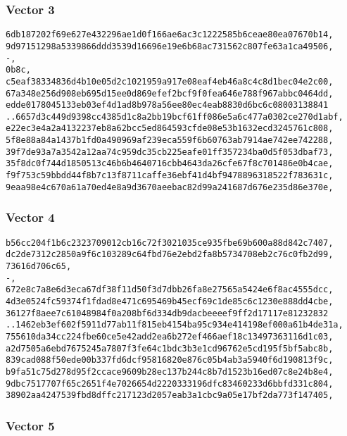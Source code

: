 \documentclass[
]{article}
\begin{document}
\hypertarget{vector-3-1}{%
\subsubsection{Vector 3}\label{vector-3-1}}

\begin{verbatim}
6db187202f69e627e432296ae1d0f166ae6ac3c1222585b6ceae80ea07670b14,
9d97151298a5339866ddd3539d16696e19e6b68ac731562c807fe63a1ca49506,
-,
0b8c,
c5eaf38334836d4b10e05d2c1021959a917e08eaf4eb46a8c4c8d1bec04e2c00,
67a348e256d908eb695d15ee0d869efef2bcf9f0fea646e788f967abbc0464dd,
edde0178045133eb03ef4d1ad8b978a56ee80ec4eab8830d6bc6c08003138841
..6657d3c449d9398cc4385d1c8a2bb19bcf61ff086e5a6c477a0302ce270d1abf,
e22ec3e4a2a4132237eb8a62bcc5ed864593cfde08e53b1632ecd3245761c808,
5f8e88a84a1437b1fd0a490969af239eca559f6b60763ab7914ae742ee742288,
39f7de93a7a3542a12aa74c959dc35cb225eafe01ff357234ba0d5f053dbaf73,
35f8dc0f744d1850513c46b6b4640716cbb4643da26cfe67f8c701486e0b4cae,
f9f753c59bbdd44f8b7c13f8711caffe36ebf41d4bf9478896318522f783631c,
9eaa98e4c670a61a70ed4e8a9d3670aeebac82d99a241687d676e235d86e370e,
\end{verbatim}

\hypertarget{vector-4-1}{%
\subsubsection{Vector 4}\label{vector-4-1}}

\begin{verbatim}
b56cc204f1b6c2323709012cb16c72f3021035ce935fbe69b600a88d842c7407,
dc2de7312c2850a9f6c103289c64fbd76e2ebd2fa8b5734708eb2c76c0fb2d99,
73616d706c65,
-,
672e8c7a8e6d3eca67df38f11d50f3d7dbb26fa8e27565a5424e6f8ac4555dcc,
4d3e0524fc59374f1fdad8e471c695469b45ecf69c1de85c6c1230e888dd4cbe,
36127f8aee7c61048984f0a208bf6d334db9dacbeeeef9ff2d17117e81232832
..1462eb3ef602f5911d77ab11f815eb4154ba95c934e414198ef000a61b4de31a,
755610da34cc224fbe60ce5e42add2ea6b272ef466aef18c13497363116d1c03,
a2d7505a6ebd7675245a7807f3fe64c1bdc3b3e1cd96762e5cd195f5bf5abc8b,
839cad088f50ede00b337fd6dcf95816820e876c05b4ab3a5940f6d190813f9c,
b9fa51c75d278d95f2ccace9609b28ec137b244c8b7d1523b16ed07c8e24b8e4,
9dbc7517707f65c2651f4e7026654d2220333196dfc83460233d6bbfd331c804,
38902aa4247539fbd8dffc217123d2057eab3a1cbc9a05e17bf2da773f147405,
\end{verbatim}

\hypertarget{vector-5-1}{%
\subsubsection{Vector 5}\label{vector-5-1}}
\end{document}
